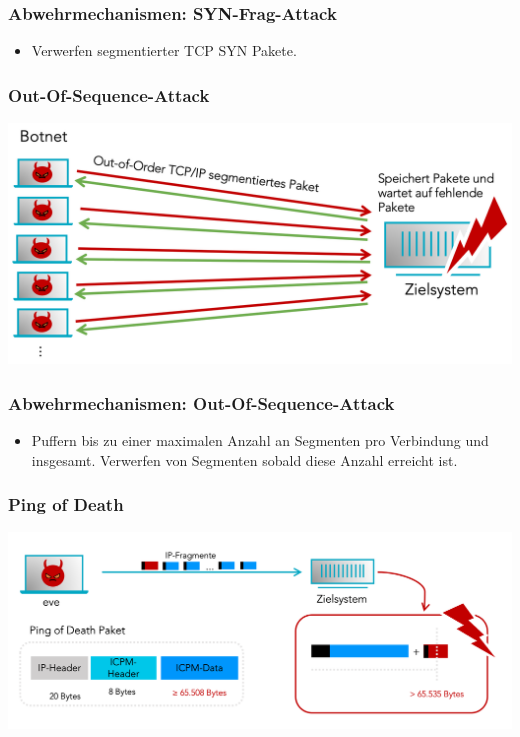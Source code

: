 \documentclass{beamer}
\begin{document}
\begin{frame}
	\frametitle{Abwehrmechanismen: SYN-Frag-Attack }
	\begin{itemize}
		\item Verwerfen segmentierter TCP SYN Pakete. %
	\end{itemize}
\end{frame}

\begin{frame}
	\frametitle{Out-Of-Sequence-Attack}
	\begin{center}
		\includegraphics[width=0.9\linewidth]{img/seg}
	\end{center}
\end{frame}

\begin{frame}
	\frametitle{Abwehrmechanismen: Out-Of-Sequence-Attack}
	\begin{itemize}
		\item Puffern bis zu einer maximalen Anzahl an Segmenten pro Verbindung und insgesamt. Verwerfen von Segmenten sobald diese Anzahl erreicht ist.
	\end{itemize}
\end{frame}

\begin{frame}
	\frametitle{Ping of Death}
	\begin{center}
		\includegraphics[width=0.9\linewidth]{img/5}
	\end{center}
\end{frame}
\end{document}
